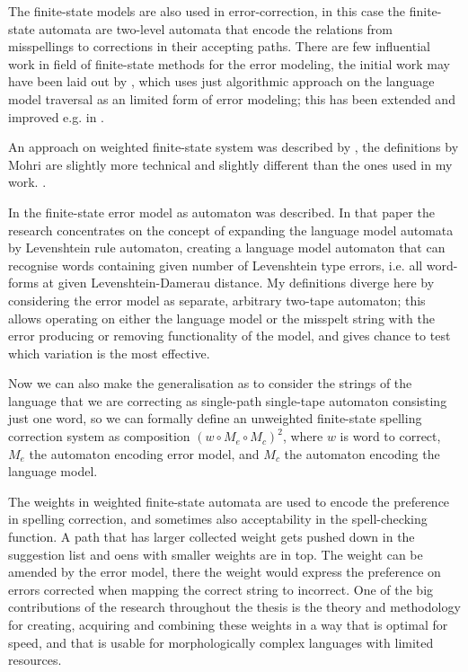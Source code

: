 \documentclass[officiallayout,draft]{unihelcompling}
\begin{document}
The finite-state models are also used in error-correction, in this case the
finite-state automata are two-level automata that encode the relations from
misspellings to corrections in their accepting paths. There are few influential
work in field of finite-state methods for the error modeling, the initial work
may have been laid out by \cite{oflazer1996errortolerant}, which uses just
algorithmic approach on the language model traversal as an limited form of
error modeling; this has been extended and improved e.g. in
\cite{hulden2009fast}. 

An approach on weighted finite-state system was
described by \cite{mohri2003edit}, the definitions by Mohri are slightly more
technical and slightly different than the ones used in my work. .

In \cite{agata2002typographical} the
finite-state error model as automaton was described. In that paper the research
concentrates on the concept of expanding the language model automata by
Levenshtein rule automaton, creating a language model automaton that can
recognise words containing given number of Levenshtein type errors, i.e. all
word-forms at given Levenshtein-Damerau distance. My definitions diverge here
by considering the error model as separate, arbitrary two-tape automaton; this
allows operating on either the language model or the misspelt string with the
error producing or removing functionality of the model, and gives chance to
test which variation is the most effective. 

Now we can also make the generalisation as to consider the strings of the
language that we are correcting as single-path single-tape automaton consisting
just one word, so we can formally define an unweighted finite-state spelling
correction system as composition $(w \circ M_e \circ M_c)^2$, where $w$ is word
to correct, $M_e$ the automaton encoding error model, and $M_c$ the automaton
encoding the language model. 

The weights in weighted finite-state automata are used to encode the preference
in spelling correction, and sometimes also acceptability in the spell-checking
function. A path that has larger collected weight gets pushed down in the
suggestion list and oens with smaller weights are in top. The weight can be
amended by the error model, there the weight would express the preference on
errors corrected when mapping the correct string to incorrect. One of the big
contributions of the research throughout the thesis is the theory and
methodology for creating, acquiring and combining these weights in a way that
is optimal for speed, and that is usable for morphologically complex languages
with limited resources.
\end{document}
